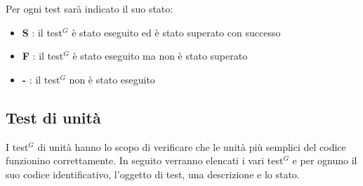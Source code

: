 \documentclass[a4paper,10pt]{article}
\begin{document}
Per ogni test sarà indicato il suo stato:
\begin{itemize}
    \item \textbf{S} : il test$^G$ è stato eseguito ed è stato superato con successo
    \item \textbf{F} : il test$^G$ è stato eseguito ma non è stato superato
    \item \textbf{-} : il test$^G$ non è stato eseguito
\end{itemize}

\subsection{Test di unità}
I test$^G$ di unità hanno lo scopo di verificare che le unità più semplici del codice funzionino correttamente. In seguito verranno elencati i vari test$^G$ e per ognuno il suo codice identificativo, l'oggetto di test, una descrizione e lo stato. \\


\newcommand{\testU}{%
    \stepcounter{TU@}%
    \noindent{TU-\arabic{TU@}}\quad\par
}
\end{document}
